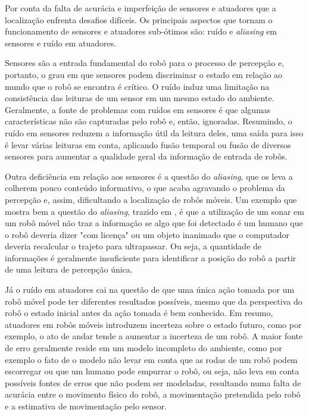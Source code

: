 \documentclass[acronym, symbols, table]{fei}
\begin{document}
			Por conta da falta de acurácia e imperfeição de sensores e atuadores que a localização enfrenta desafios difíceis. Os principais aspectos que tornam o funcionamento de sensores e atuadores sub-ótimos são: ruído e \textit{aliasing} em sensores e ruído em atuadores.
			
			Sensores são a entrada fundamental do robô para o processo de percepção	e, portanto, o grau em que sensores podem discriminar o estado em relação ao mundo que o robô se encontra é crítico. O ruído induz uma limitação na consistência das leituras de um sensor em um mesmo estado do ambiente. Geralmente, a fonte de problemas com ruídos em sensores é que algumas características não são capturadas pelo robô e, então, ignoradas. Resumindo, o ruído em sensores reduzem a informação útil da leitura deles, uma saída para isso é levar várias leituras em conta, aplicando fusão temporal ou fusão de diversos sensores para aumentar a qualidade geral da informação de entrada de robôs.
			
			Outra deficiência em relação aos sensores é a questão do \textit{aliasing}, que os leva a colherem pouco conteúdo informativo, o que acaba agravando o problema da percepção e, assim, dificultando a localização de robôs móveis. Um exemplo que mostra bem a questão do \textit{aliasing}, trazido em \textcite{siegwart2011introduction}, é que a utilização de um sonar em um robô móvel não traz a informação se algo que foi detectado é um humano que o robô deveria dizer "com licença" ou um objeto inanimado que o computador deveria recalcular o trajeto para ultrapassar. Ou seja, a quantidade de informações é geralmente insuficiente para identificar a posição do robô a partir de uma leitura de percepção única.
			
			Já o ruído em atuadores cai na questão de que uma única ação tomada por um robô móvel pode ter diferentes resultados possíveis, mesmo que da perspectiva do robô o estado inicial antes da ação tomada é bem conhecido. Em resumo, atuadores em robôs móveis introduzem incerteza sobre o estado futuro, como por exemplo, o ato de andar tende a aumentar a incerteza de um robô. A maior fonte de erro geralmente reside em um modelo incompleto do ambiente, como por exemplo o fato de o modelo não levar em conta que as rodas de um robô podem escorregar ou que um humano pode empurrar o robô, ou seja, não leva em conta possíveis fontes de erros que não podem ser modeladas, resultando numa falta de acurácia entre o movimento físico do robô, a movimentação pretendida pelo robô e a estimativa de movimentação pelo sensor.
		
\end{document}
